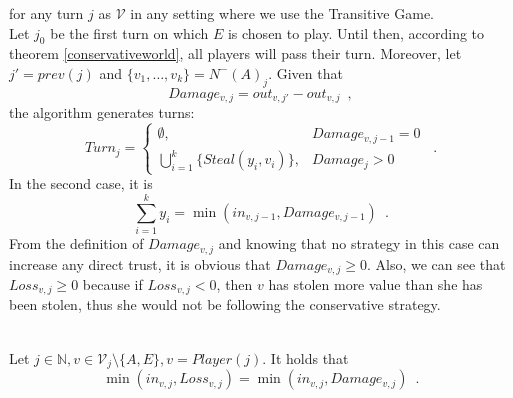 \documentclass[11pt]{llncs}
\begin{document}
    for any turn $j$ as $\mathcal{V}$ in any setting where we use the Transitive Game. \\
    Let $j_0$ be the first turn on which $E$ is chosen to play. Until then, according to theorem \ref{conservativeworld},
    all players will pass their turn. Moreover, let $j' = prev\left(j\right)$ and $\{v_1, \dots, v_k\} =
    N^{-}\left(A\right)_j$. Given that
    \begin{equation}
       Damage_{v,j} = out_{v,j'} - out_{v,j} \enspace,
    \end{equation}
    the algorithm generates turns:
    \begin{equation}
       Turn_j =
         \begin{cases}
            \emptyset, & Damage_{v,j-1} = 0 \\
            \bigcup\limits_{i=1}^{k}\{Steal\left(y_i,v_i\right)\}, & Damage_j > 0
         \end{cases} \enspace.
    \end{equation}
    In the second case, it is
    \begin{equation}
       \sum\limits_{i=1}^{k}y_i = \min\left(in_{v, j-1}, Damage_{v, j-1}\right) \enspace.
    \end{equation}
    From the definition of $Damage_{v,j}$ and knowing that no strategy in this case can increase any direct trust, it is
    obvious that $Damage_{v,j} \geq 0$. Also, we can see that $Loss_{v,j} \geq 0$ because if $Loss_{v,j} < 0$, then $v$ has
    stolen more value than she has been stolen, thus she would not be following the conservative strategy.
    \begin{lemma} \ \\
       Let $j \in \mathbb{N}, v \in \mathcal{V}_j \setminus \{A, E\}, v = Player\left(j\right)$. It holds that
       \begin{equation}
          \min\left(in_{v, j}, Loss_{v, j}\right) = \min\left(in_{v, j}, Damage_{v, j}\right) \enspace.
       \end{equation}
    \end{lemma}
\end{document}
